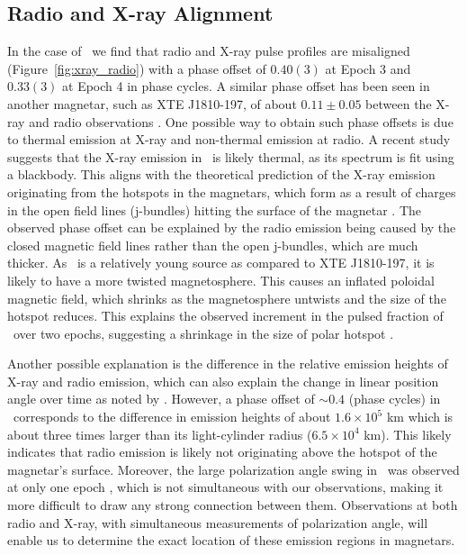 \documentclass[twocolumn]{emulateapj}
\begin{document}
\subsection{Radio and X-ray Alignment}
\label{ssec:align}
In the case of \jmag\, we find that radio and X-ray pulse profiles are misaligned 
(Figure~\ref{fig:xray_radio}) with a phase offset of $0.40(3)$ at Epoch 3 and 
$0.33(3)$ at Epoch 4 in phase cycles. A similar phase offset has been seen in 
another magnetar, such as 
XTE J1810-197, of about $0.11 \pm 0.05$ between the X-ray and radio observations 
\citep{pearlman2020bright}. One possible way to obtain such phase offsets is due 
to thermal emission at X-ray and non-thermal emission at radio. A recent study 
\citep{hu2020} suggests that the X-ray emission in \jmag\ is likely thermal, as 
its spectrum is fit using a blackbody. This aligns with the theoretical prediction 
of the X-ray emission originating from the hotspots in the magnetars, which form 
as a result of charges in the open field lines (j-bundles) hitting the surface 
of the magnetar \citep{beloborodov2009}. The observed phase offset can be explained 
by the radio emission being caused by the closed magnetic field lines rather than 
the open j-bundles, which are much thicker. As \jmag\ is a relatively young source 
as compared to XTE J1810-197, it is likely to have a more twisted magnetosphere. 
This causes an inflated poloidal magnetic field, which shrinks as the magnetosphere 
untwists and the size of the hotspot reduces. This explains the observed increment 
in the pulsed fraction of \jmag\ over two epochs, suggesting a shrinkage in the size 
of polar hotspot \citep{hu2020}.  

Another possible explanation is the difference in the relative emission heights 
of X-ray and radio emission, which can also explain the change in linear position 
angle over time as noted by \cite{lower2021}. However, a phase offset of $\sim0.4$ 
(phase cycles) in  \jmag\ corresponds to the difference in emission heights of about 
$1.6 \times 10^5$ km which is about three times larger than its light-cylinder radius 
($6.5 \times 10^{4}$ km). This likely indicates that radio emission is likely not 
originating above the hotspot of the magnetar's surface. Moreover, the large 
polarization angle swing in \jmag\ was observed at only one epoch \citep{lower2021}, 
which is not simultaneous with our observations, making it more difficult to draw any 
strong connection between them. Observations at both radio and X-ray, with simultaneous 
measurements of polarization angle, will enable us to determine the exact location 
of these emission regions in magnetars.
\end{document}
